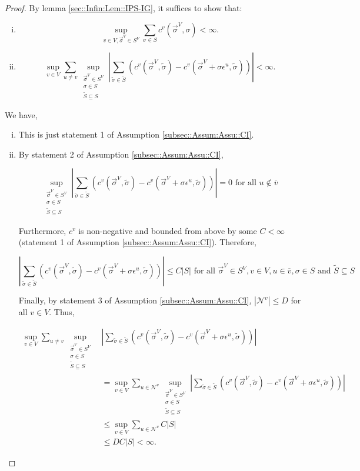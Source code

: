 \documentclass[12pt]{article}
\newcommand{\mc}{\mathcal}
\newcommand{\ov}{\overline}
\newcommand{\te}{\text}
\newcommand{\ep}{\epsilon}
\renewcommand{\v}{v}							%
\newcommand{\vv}{u}								%
\renewcommand{\S}{S}							%
\newcommand{\s}{\sigma}							%
\newcommand{\sv}{\vec{\s}}						%
\newcommand{\ev}{\ep}							%
\newcommand{\IGr}{c}							%
\newcommand{\neigh}{\mc{N}}						%
\newcommand{\vind}[1]{^{#1}}					%
\newcommand{\carp}[1]{^{#1}}					%
\newcommand{\vsi}[1]{^{#1}}						%
\newcommand{\cl}{\ov}							%
\newcommand{\const}{C}							%
\newcommand{\degr}{D}							%
\renewcommand{\ss}{\tilde{\s}}					%
\renewcommand{\SS}{\tilde{\S}}					%
\begin{document}
\begin{proof}
By lemma \ref{sec::Infin:Lem::IPS-IG}, it suffices to show that:

\begin{enumerate}[i)]
\item 

\[\sup_{\v \in V,\sv\vsi{V} \in \S\carp{V}} \sum_{\s \in \S} \IGr\vind{\v}(\sv\vsi{V},\s) < \infty.\]

\item 

\[\sup_{\v\in V}\sum_{\vv\neq \v} \sup_{\substack{\sv\vsi{V} \in \S\carp{V}\\ \s\in \S\\ \SS \subseteq \S}} \left|\sum_{\ss \in \SS} (\IGr\vind{\v}(\sv\vsi{V},\ss) - \IGr\vind{\v}(\sv\vsi{V}+\s \ev\vind{\vv},\ss))\right| < \infty.\]
\end{enumerate}

We have,

\begin{enumerate}[i)]
\item This is just statement 1 of Assumption \ref{subsec::Assum:Assu::CI}.

\item By statement 2 of Assumption \ref{subsec::Assum:Assu::CI}, 

\[\sup_{\substack{\sv\vsi{V} \in \S\carp{V}\\ \s\in \S\\ \SS\subseteq \S}} \left|\sum_{\ss \in \SS} (\IGr\vind{\v}(\sv\vsi{V},\ss) - \IGr\vind{\v}(\sv\vsi{V}+\s \ev\vind{\vv},\ss))\right| = 0 \te{ for all } \vv \notin \cl{\v}\]

Furthermore, \(\IGr\vind{\v}\) is non-negative and bounded from above by some \(\const < \infty\) (statement 1 of Assumption \ref{subsec::Assum:Assu::CI}). Therefore, 

\[\left|\sum_{\ss \in \SS} (\IGr\vind{\v}(\sv\vsi{V},\ss) - \IGr\vind{\v}(\sv\vsi{V}+\s\ev\vind{\vv},\ss))\right| \leq \const|\S| \te{ for all } \sv\vsi{V} \in \S\carp{V},\v \in V, \vv \in \cl{\v}, \s \in \S \te{ and } \SS\subseteq \S\]

Finally, by statement 3 of Assumption \ref{subsec::Assum:Assu::CI}, \(|\neigh\vind{\v}| \leq \degr\) for all \(\v \in V\). Thus,

\begin{align*}
\sup_{\v\in V}\sum_{\vv \neq \v} \sup_{\substack{\sv\vsi{V} \in \S\carp{V}\\ \s\in \S\\ \SS\subseteq \S}}& \left|\sum_{\ss \in \SS} (\IGr\vind{\v}(\sv\vsi{V},\ss) - \IGr\vind{\v}(\sv\vsi{V}+\s\ev\vind{\vv},\ss))\right|\\
&  = \sup_{\v\in V}\sum_{\vv\in \neigh\vind{\v}} \sup_{\substack{\sv\vsi{V} \in \S\carp{V}\\ \s\in \S\\ \SS\subseteq \S}} \left|\sum_{\ss \in \SS} (\IGr\vind{\v}(\sv\vsi{V},\ss) - \IGr\vind{\v}(\sv\vsi{V}+\s\ev\vind{\vv},\ss))\right|\\
&\leq \sup_{\v\in V} \sum_{\vv \in \neigh\vind{\v}} \const|\S|\\
&\leq \degr \const|\S| < \infty.
\end{align*}



\end{enumerate}
\end{proof}
\end{document}
